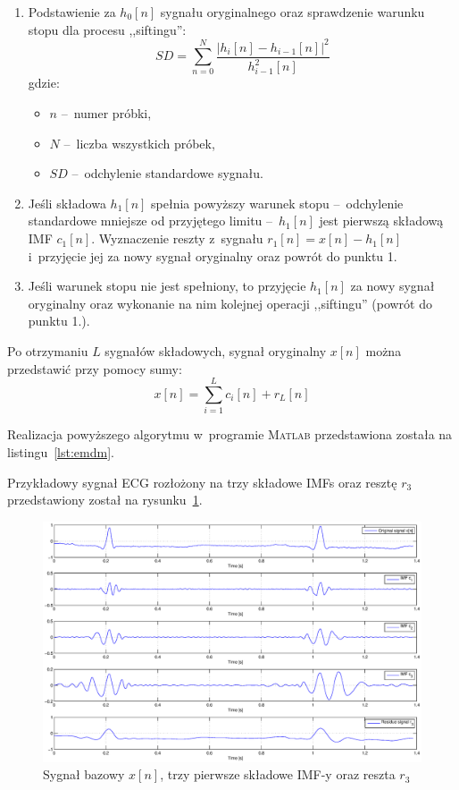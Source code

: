 \begin{enumerate}[1.]
\begin{figure}[!ht]
    \end{figure}
    \item Podstawienie za $h_0[n]$ sygnału oryginalnego oraz sprawdzenie warunku
    stopu dla procesu ,,siftingu'':
    \begin{equation}
        SD = \sum\limits_{n = 0}^{N} \frac{\left| h_i[n] - h_{i - 1}[n]
        \right|^2}{h_{i - 1} ^ 2[n]}
    \end{equation}
    gdzie:
    \begin{itemize}
        \item $n$ --~numer próbki,
        \item $N$ --~liczba wszystkich próbek,
        \item $SD$ --~odchylenie standardowe sygnału.
    \end{itemize}
    \item Jeśli składowa $h_1[n]$ spełnia powyższy warunek stopu --~odchylenie
    standardowe mniejsze od przyjętego limitu --~$h_1[n]$ jest pierwszą składową
    IMF $c_1[n]$. Wyznaczenie reszty z~sygnału $r_1[n] = x[n] - h_1[n]$
    i~przyjęcie jej za nowy sygnał oryginalny oraz powrót do punktu 1.
    \item Jeśli warunek stopu nie jest spełniony, to przyjęcie $h_1[n]$ za nowy
    sygnał oryginalny oraz wykonanie na nim kolejnej operacji ,,siftingu''
    (powrót do punktu 1.).
\end{enumerate}

Po otrzymaniu $L$ sygnałów składowych, sygnał oryginalny $x[n]$ można
przedstawić przy pomocy sumy:
\begin{equation}
    x[n] = \sum\limits_{i = 1}^L c_i[n] + r_L[n]
\end{equation}

Realizacja powyższego algorytmu w~programie \textsc{Matlab} przedstawiona
została na listingu~\ref{lst:emdm}.

\newpage

Przykładowy sygnał ECG rozłożony na trzy składowe IMFs oraz resztę $r_3$
przedstawiony został na rysunku~\ref{fig:sampleimfs}.
\begin{figure}[!ht]
    \centering
    \includegraphics[width=\textwidth]{../img/sampleimfs.eps}
    \caption{Sygnał bazowy $x[n]$, trzy pierwsze składowe IMF-y oraz reszta
    $r_3$}
    \label{fig:sampleimfs}
\end{figure}

